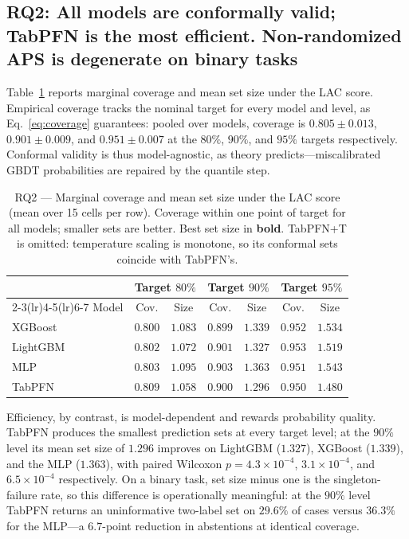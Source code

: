 \documentclass[review,12pt]{elsarticle}
\begin{document}
\subsection{RQ2: All models are conformally valid; TabPFN is the most efficient. Non-randomized APS is degenerate on binary tasks}
\label{sec:rq2}

Table~\ref{tab:rq2} reports marginal coverage and mean set size under the LAC score. Empirical coverage tracks the nominal target for every model and level, as Eq.~\eqref{eq:coverage} guarantees: pooled over models, coverage is $0.805 \pm 0.013$, $0.901 \pm 0.009$, and $0.951 \pm 0.007$ at the $80\%$, $90\%$, and $95\%$ targets respectively. Conformal validity is thus model-agnostic, as theory predicts---miscalibrated GBDT probabilities are repaired by the quantile step.

\begin{table}[t]
\centering
\caption{RQ2 --- Marginal coverage and mean set size under the LAC score (mean over 15 cells per row). Coverage within one point of target for all models; smaller sets are better. Best set size in \textbf{bold}. TabPFN+T is omitted: temperature scaling is monotone, so its conformal sets coincide with TabPFN's.}
\label{tab:rq2}
\small
\begin{tabular}{lcccccc}
\toprule
 & \multicolumn{2}{c}{Target $80\%$} & \multicolumn{2}{c}{Target $90\%$} & \multicolumn{2}{c}{Target $95\%$} \\
\cmidrule(lr){2-3}\cmidrule(lr){4-5}\cmidrule(lr){6-7}
Model & Cov. & Size & Cov. & Size & Cov. & Size \\
\midrule
XGBoost   & $0.800$ & $1.083$ & $0.899$ & $1.339$ & $0.952$ & $1.534$ \\
LightGBM  & $0.802$ & $1.072$ & $0.901$ & $1.327$ & $0.953$ & $1.519$ \\
MLP       & $0.803$ & $1.095$ & $0.903$ & $1.363$ & $0.951$ & $1.543$ \\
TabPFN    & $0.809$ & $\mathbf{1.058}$ & $0.900$ & $\mathbf{1.296}$ & $0.950$ & $\mathbf{1.480}$ \\
\bottomrule
\end{tabular}
\end{table}

Efficiency, by contrast, is model-dependent and rewards probability quality. TabPFN produces the smallest prediction sets at every target level; at the $90\%$ level its mean set size of $1.296$ improves on LightGBM ($1.327$), XGBoost ($1.339$), and the MLP ($1.363$), with paired Wilcoxon $p = 4.3\times10^{-4}$, $3.1\times10^{-4}$, and $6.5\times10^{-4}$ respectively. On a binary task, set size minus one is the singleton-failure rate, so this difference is operationally meaningful: at the $90\%$ level TabPFN returns an uninformative two-label set on $29.6\%$ of cases versus $36.3\%$ for the MLP---a $6.7$-point reduction in abstentions at identical coverage.
\end{document}
